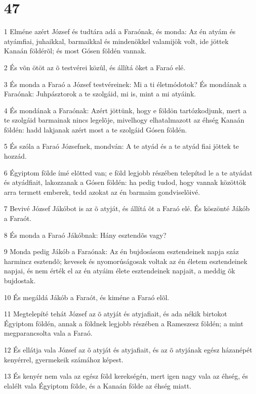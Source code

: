 \chapter{47}

\par 1 Elméne azért József és tudtára adá a Faraónak, és monda: Az én atyám és atyámfiai, juhaikkal, barmaikkal és mindenökkel valamijök volt, ide jöttek Kanaán földérõl; és most Gósen földén vannak.
\par 2 És võn ötöt az õ testvérei közûl, és állítá õket a Faraó elé.
\par 3 És monda a Faraó a József testvéreinek: Mi a ti életmódotok? És mondának a Faraónak: Juhpásztorok a te szolgáid, mi is, mint a mi atyáink.
\par 4 És mondának a Faraónak: Azért jöttünk, hogy e földön tartózkodjunk, mert a te szolgáid barmainak nincs legelõje, mivelhogy elhatalmazott az éhség Kanaán földén: hadd lakjanak azért most a te szolgáid Gósen földén.
\par 5 És szóla a Faraó Józsefnek, mondván: A te atyád és a te atyád fiai jöttek te hozzád.
\par 6 Égyiptom földe ímé elõtted van; e föld legjobb részében telepítsd le a te atyádat és atyádfiait, lakozzanak a Gósen földén: ha pedig tudod, hogy vannak közöttök arra termett emberek, tedd azokat az én barmaim gondviselõivé.
\par 7 Bevivé József Jákóbot is az õ atyját, és állítá õt a Faraó elé. És köszönté Jákób a Faraót.
\par 8 És monda a Faraó Jákóbnak: Hány esztendõs vagy?
\par 9 Monda pedig Jákób a Faraónak: Az én bujdosásom esztendeinek napja száz harmincz esztendõ; kevesek és nyomorúságosak voltak az én életem esztendeinek napjai, és nem érték el az én atyáim élete esztendeinek napjait, a meddig õk bujdostak.
\par 10 És megáldá Jákób a Faraót, és kiméne a Faraó elõl.
\par 11 Megtelepíté tehát József az õ atyját és atyjafiait, és ada nékik birtokot Égyiptom földén, annak a földnek legjobb részében a Rameszesz földén; a mint megparancsolta vala a Faraó.
\par 12 És ellátja vala József az õ atyját és atyjafiait, és az õ atyjának egész házanépét kenyérrel, gyermekeik számához képest.
\par 13 És kenyér nem vala az egész föld kerekségén, mert igen nagy vala az éhség, és elalélt vala Égyiptom földe, és a Kanaán földe az éhség miatt.
